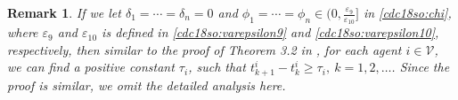 \documentclass[letterpaper, 10 pt, conference]{ieeeconf}  %
\newcommand{\blue}[1]{{\color{blue} #1}}
\newtheorem{remark}{Remark}
\begin{document}
\begin{remark}
If we let $\delta_1=\cdots=\delta_n=0$ and $\phi_1=\cdots=\phi_n\in(0,\frac{\varepsilon_9}{\varepsilon_{10}}]$ in \eqref{cdc18so:chi}, where $\varepsilon_9$ and $\varepsilon_{10}$ is defined in \eqref{cdc18so:varepsilon9} and \eqref{cdc18so:varepsilon10}, respectively, then similar to the proof of Theorem 3.2 in \cite{seyboth2013event}, for each agent $i\in\mathcal V$, we can find a positive constant $\tau_i$, such that $t^i_{k+1}-t^i_k\ge \tau_i,~k=1,2,\dots$. Since the proof is similar, we omit the detailed analysis here.
\end{remark}


\end{document}
